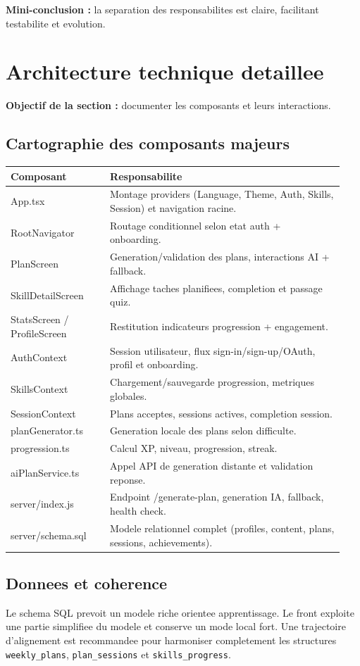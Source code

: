 \documentclass[12pt,a4paper]{article}
\begin{document}
\textbf{Mini-conclusion :} la separation des responsabilites est claire, facilitant testabilite et evolution.

\section{Architecture technique detaillee}
\textbf{Objectif de la section :} documenter les composants et leurs interactions.

\subsection{Cartographie des composants majeurs}
\begin{longtable}{p{0.28\linewidth}p{0.66\linewidth}}
\toprule
\textbf{Composant} & \textbf{Responsabilite} \\
\midrule
App.tsx & Montage providers (Language, Theme, Auth, Skills, Session) et navigation racine. \\
RootNavigator & Routage conditionnel selon etat auth + onboarding. \\
PlanScreen & Generation/validation des plans, interactions AI + fallback. \\
SkillDetailScreen & Affichage taches planifiees, completion et passage quiz. \\
StatsScreen / ProfileScreen & Restitution indicateurs progression + engagement. \\
AuthContext & Session utilisateur, flux sign-in/sign-up/OAuth, profil et onboarding. \\
SkillsContext & Chargement/sauvegarde progression, metriques globales. \\
SessionContext & Plans acceptes, sessions actives, completion session. \\
planGenerator.ts & Generation locale des plans selon difficulte. \\
progression.ts & Calcul XP, niveau, progression, streak. \\
aiPlanService.ts & Appel API de generation distante et validation reponse. \\
server/index.js & Endpoint /generate-plan, generation IA, fallback, health check. \\
server/schema.sql & Modele relationnel complet (profiles, content, plans, sessions, achievements). \\
\bottomrule
\end{longtable}

\subsection{Donnees et coherence}
Le schema SQL prevoit un modele riche orientee apprentissage. Le front exploite une partie simplifiee du modele et conserve un mode local fort. Une trajectoire d'alignement est recommandee pour harmoniser completement les structures \texttt{weekly\_plans}, \texttt{plan\_sessions} et \texttt{skills\_progress}.
\end{document}
